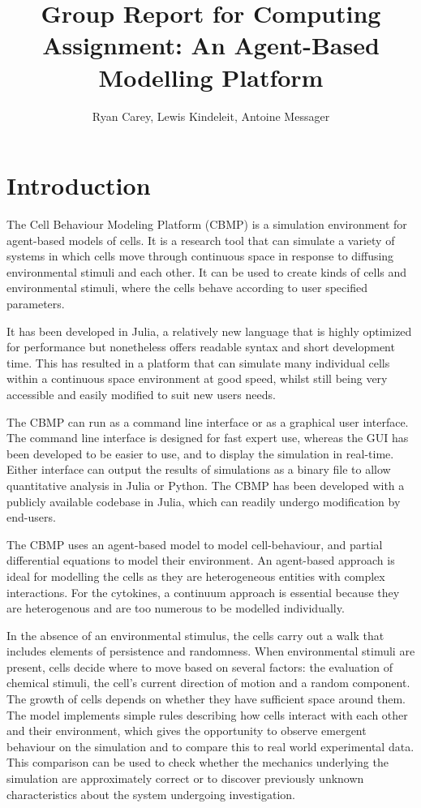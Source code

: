 \documentclass[11.5pt]{article}
\title{Group Report for Computing Assignment: An Agent-Based Modelling Platform}
\author{Ryan Carey, Lewis Kindeleit, Antoine Messager}
\begin{document}
\maketitle

\newpage
\tableofcontents
\newpage

\section{Introduction}
The Cell Behaviour Modeling Platform (CBMP) is a simulation environment 
for agent-based models of cells. It is a research tool that can simulate 
a variety of systems in which cells move through continuous space in 
response to diffusing environmental stimuli and each other. It can be 
used to create kinds of cells and environmental stimuli, where the cells 
behave according to user specified parameters.

It has been developed in Julia, a relatively new language that is highly 
optimized for performance but nonetheless offers readable syntax and 
short development time. This has resulted in a platform that can 
simulate many individual cells within a continuous space environment at 
good speed, whilst still being very accessible and easily modified to 
suit new users needs.

The CBMP can run as a command line interface or as a graphical user 
interface. The command line interface is designed for fast expert use, 
whereas the GUI has been developed to be easier to use, and to display 
the simulation in real-time. Either interface can output the results of 
simulations as a binary file to allow quantitative analysis in Julia or 
Python. The CBMP has been developed with a publicly available codebase 
in Julia, which can readily undergo modification by end-users.

The CBMP uses an agent-based model to model cell-behaviour, and partial 
differential equations to model their environment. An agent-based 
approach is ideal for modelling the cells as they are heterogeneous 
entities with complex interactions. For the cytokines, a continuum 
approach is essential because they are heterogenous and are too numerous 
to be modelled individually.

In the absence of an environmental stimulus, the cells carry out a walk 
that includes elements of persistence and randomness. When environmental 
stimuli are present, cells decide where to move based on several 
factors: the evaluation of chemical stimuli, the cell's current 
direction of motion and a random component. The growth of cells depends 
on whether they have sufficient space around them. The model implements 
simple rules describing how cells interact with each other and their 
environment, which gives the opportunity to observe emergent behaviour 
on the simulation and to compare this to real world experimental data. 
This comparison can be used to check whether the mechanics underlying 
the simulation are approximately correct or to discover previously 
unknown characteristics about the system undergoing investigation.
\end{document}

